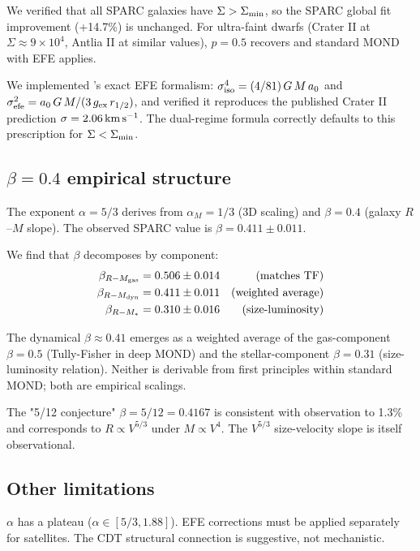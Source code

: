 \documentclass[twocolumn]{aastex631}
\begin{document}
We verified that all SPARC galaxies have $\Sigma > \Sigma_{\rm min}$,
so the SPARC global fit improvement (+14.7\%) is unchanged. For
ultra-faint dwarfs (Crater II at $\Sigma \approx 9\times 10^4$,
Antlia II at similar values), $p = 0.5$ recovers and standard
MOND with EFE applies.

We implemented \citet{McGaugh2016Crater}'s exact EFE formalism:
$\sigma_{\rm iso}^4 = (4/81)\,G\,M\,a_0$ and
$\sigma_{\rm efe}^2 = a_0\,G\,M / (3\,g_{\rm ex}\,r_{1/2})$, and
verified it reproduces the published Crater II prediction
$\sigma = 2.06\,{\rm km}\,{\rm s}^{-1}$. The dual-regime formula
correctly defaults to this prescription for $\Sigma < \Sigma_{\rm min}$.

\subsection{$\beta = 0.4$ empirical structure}

The exponent $\alpha = 5/3$ derives from $\alpha_M = 1/3$ (3D
scaling) and $\beta = 0.4$ (galaxy $R$--$M$ slope). The observed
SPARC value is $\beta = 0.411 \pm 0.011$.

We find that $\beta$ decomposes by component:
\begin{align}
\beta_{R-M_{\rm gas}} &= 0.506 \pm 0.014 & \text{(matches TF)} \\
\beta_{R-M_{\rm dyn}} &= 0.411 \pm 0.011 & \text{(weighted average)} \\
\beta_{R-M_*} &= 0.310 \pm 0.016 & \text{(size-luminosity)}
\end{align}

The dynamical $\beta \approx 0.41$ emerges as a weighted average of
the gas-component $\beta = 0.5$ (Tully-Fisher in deep MOND) and the
stellar-component $\beta = 0.31$ (size-luminosity relation). Neither
is derivable from first principles within standard MOND; both are
empirical scalings.

The "5/12 conjecture" $\beta = 5/12 = 0.4167$ is consistent with
observation to 1.3\% and corresponds to $R \propto V^{5/3}$ under
$M \propto V^4$. The $V^{5/3}$ size-velocity slope is itself
observational.

\subsection{Other limitations}

$\alpha$ has a plateau ($\alpha \in [5/3, 1.88]$). EFE corrections
must be applied separately for satellites. The CDT structural
connection is suggestive, not mechanistic.
\end{document}
